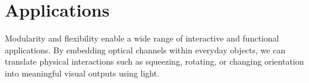 \section{Applications}
\label{sec:apps}

Modularity and flexibility enable a wide range of interactive and functional applications. By embedding optical channels within everyday objects, we can translate physical interactions such as squeezing, rotating, or changing orientation into meaningful visual outputs using light. %















